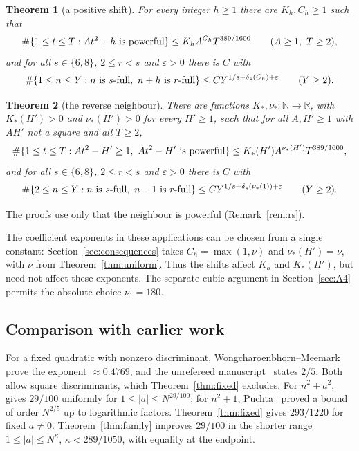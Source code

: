 \documentclass[11pt,reqno]{amsart}
\newtheorem{theorem}{Theorem}[section]
\theoremstyle{definition}
\theoremstyle{remark}
\numberwithin{equation}{section}
\newcommand{\R}{\mathbb R}\newcommand{\Z}{\mathbb Z}\newcommand{\N}{\mathbb N}
\newcommand{\eps}{\varepsilon}\newcommand{\card}{\#}
\begin{document}
\begin{theorem}[a positive shift]\label{thm:positive}
For every integer $h\ge1$ there are $K_h,C_h\ge1$ such
that
\[
 \card\{1\le t\le T:At^2+h\textnormal{ is powerful}\}\le K_hA^{C_h}T^{389/1600}
 \qquad(A\ge1,\ T\ge2),
\]
and for all $s\in\{6,8\}$, $2\le r<s$ and $\eps>0$ there is $C$ with
\[
 \card\{1\le n\le Y:n\textnormal{ is }s\textnormal{-full},\ n+h\textnormal{ is }r\textnormal{-full}\}
 \le CY^{1/s-\delta_s(C_h)+\eps}\qquad(Y\ge2).
\]
\end{theorem}

\begin{theorem}[the reverse neighbour]\label{thm:reverse}
There are functions $K_*,\nu_*:\N\to\R$, with
$K_*(H')>0$ and $\nu_*(H')>0$ for every $H'\ge1$, such that for all
$A,H'\ge1$ with $AH'$ not a square and all $T\ge2$,
\[
 \card\{1\le t\le T:At^2-H'\ge1,\ At^2-H'\textnormal{ is powerful}\}
 \le K_*(H')A^{\nu_*(H')}T^{389/1600},
\]
and for all $s\in\{6,8\}$, $2\le r<s$ and $\eps>0$ there is $C$ with
\[
 \card\{2\le n\le Y:n\textnormal{ is }s\textnormal{-full},\ n-1\textnormal{ is }r\textnormal{-full}\}
 \le CY^{1/s-\delta_s(\nu_*(1))+\eps}\qquad(Y\ge2).
\]
\end{theorem}
The proofs use only that the neighbour is powerful
(Remark~\ref{rem:rs}).

The coefficient exponents in these applications can be chosen from a
single constant: Section~\ref{sec:consequences} takes
$C_h=\max(1,\nu)$ and $\nu_*(H')=\nu$, with $\nu$ from
Theorem~\ref{thm:uniform}. Thus the shifts affect $K_h$ and $K_*(H')$,
but need not affect these exponents. The separate cubic argument in
Section~\ref{sec:A4} permits the absolute choice $\nu_1=180$.

\subsection{Comparison with earlier work}\label{sec:compare}
For a fixed quadratic with nonzero discriminant,
Wongcharoenbhorn--Meemark~\cite[Theorem~B]{wm} prove the exponent
$\approx0.4769$, and the unrefereed manuscript~\cite[Theorem~1.3]{saito}
states $2/5$. Both allow square discriminants, which
Theorem~\ref{thm:fixed} excludes. For $n^2+a^2$,
\cite[Theorem~A]{wm} gives $29/100$ uniformly for
$1\le|a|\le N^{29/100}$; for $n^2+1$, Puchta~\cite{puchta} proved a bound
of order $N^{2/5}$ up to logarithmic factors.
Theorem~\ref{thm:fixed} gives $293/1220$ for fixed $a\ne0$.
Theorem~\ref{thm:family} improves $29/100$ in the shorter range
$1\le|a|\le N^\kappa$, $\kappa<289/1050$, with equality at the endpoint.
\end{document}
